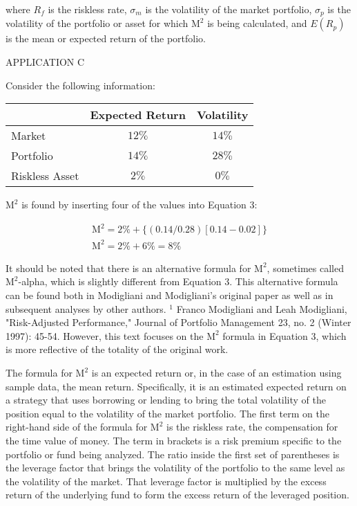 \documentclass[11pt]{article}
\begin{document}
where $R_{f}$ is the riskless rate, $\sigma_{m}$ is the volatility of the market portfolio, $\sigma_{p}$ is the volatility of the portfolio or asset for which $\mathrm{M}^{2}$ is being calculated, and $E\left(R_{p}\right)$ is the mean or expected return of the portfolio.

APPLICATION C

Consider the following information:

\begin{center}
\begin{tabular}{|l|c|c|}
\hline
 & Expected Return & Volatility \\
\hline
Market & $12 \%$ & $14 \%$ \\
\hline
Portfolio & $14 \%$ & $28 \%$ \\
\hline
Riskless Asset & $2 \%$ & $0 \%$ \\
\hline
\end{tabular}
\end{center}

$\mathrm{M}^{2}$ is found by inserting four of the values into Equation 3:

$$
\begin{array}{r}
\mathrm{M}^{2}=2 \%+\{(0.14 / 0.28)[0.14-0.02]\} \\
\mathrm{M}^{2}=2 \%+6 \%=8 \%
\end{array}
$$

It should be noted that there is an alternative formula for $\mathrm{M}^{2}$, sometimes called $\mathrm{M}^{2}$-alpha, which is slightly different from Equation 3. This alternative formula can be found both in Modigliani and Modigliani's original paper as well as in subsequent analyses by other authors. ${ }^{1}$ Franco Modigliani and Leah Modigliani, "Risk-Adjusted Performance," Journal of Portfolio Management 23, no. 2 (Winter 1997): 45-54. However, this text focuses on the $\mathrm{M}^{2}$ formula in Equation 3, which is more reflective of the totality of the original work.

The formula for $\mathrm{M}^{2}$ is an expected return or, in the case of an estimation using sample data, the mean return. Specifically, it is an estimated expected return on a strategy that uses borrowing or lending to bring the total volatility of the position equal to the volatility of the market portfolio. The first term on the right-hand side of the formula for $\mathrm{M}^{2}$ is the riskless rate, the compensation for the time value of money. The term in brackets is a risk premium specific to the portfolio or fund being analyzed. The ratio inside the first set of parentheses is the leverage factor that brings the volatility of the portfolio to the same level as the volatility of the market. That leverage factor is multiplied by the excess return of the underlying fund to form the excess return of the leveraged position.
\end{document}
